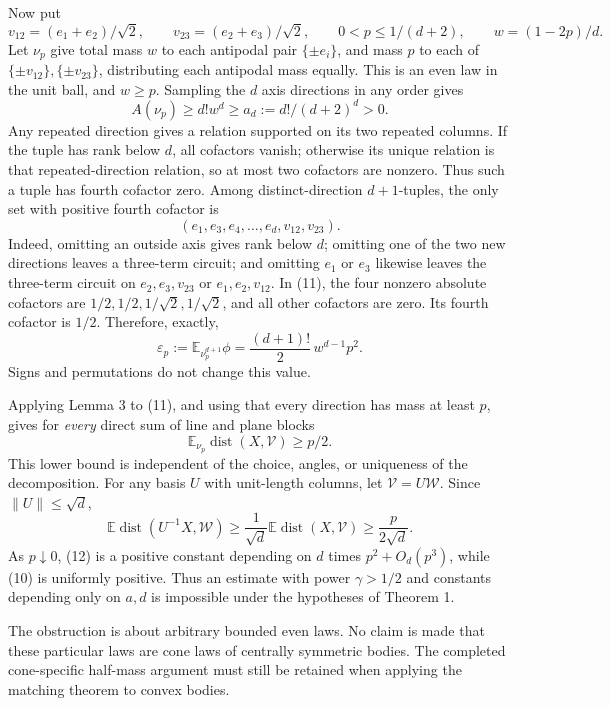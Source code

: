 \documentclass[
  11pt,
]{article}
\begin{document}
Now put \[
 v_{12}=(e_1+e_2)/\sqrt2,\qquad v_{23}=(e_2+e_3)/\sqrt2,
 \qquad 0<p\le1/(d+2),\qquad w=(1-2p)/d.
\] Let \(\nu_p\) give total mass \(w\) to each antipodal pair
\(\{\pm e_i\}\), and mass \(p\) to each of
\(\{\pm v_{12}\},\{\pm v_{23}\}\), distributing each antipodal mass
equally. This is an even law in the unit ball, and \(w\ge p\). Sampling
the \(d\) axis directions in any order gives \[
 A(\nu_p)\ge d!w^d\ge a_d:=d!/(d+2)^d>0.                 \tag{10}
\] Any repeated direction gives a relation supported on its two repeated
columns. If the tuple has rank below \(d\), all cofactors vanish;
otherwise its unique relation is that repeated-direction relation, so at
most two cofactors are nonzero. Thus such a tuple has fourth cofactor
zero. Among distinct-direction \(d+1\)-tuples, the only set with
positive fourth cofactor is \[
 (e_1,e_3,e_4,\ldots,e_d,v_{12},v_{23}).                     \tag{11}
\] Indeed, omitting an outside axis gives rank below \(d\); omitting one
of the two new directions leaves a three-term circuit; and omitting
\(e_1\) or \(e_3\) likewise leaves the three-term circuit on
\(e_2,e_3,v_{23}\) or \(e_1,e_2,v_{12}\). In (11), the four nonzero
absolute cofactors are \(1/2,1/2,1/\sqrt2,1/\sqrt2\), and all other
cofactors are zero. Its fourth cofactor is \(1/2\). Therefore, exactly,
\[
 \varepsilon_p:=\mathbb E_{\nu_p^{d+1}}\phi
 =\frac{(d+1)!}{2}\,w^{d-1}p^2.                            \tag{12}
\] Signs and permutations do not change this value.

Applying Lemma 3 to (11), and using that every direction has mass at
least \(p\), gives for \emph{every} direct sum of line and plane blocks
\[
 \mathbb E_{\nu_p}\operatorname{dist}(X,\mathcal V)
 \ge p/2.                                                  \tag{13}
\] This lower bound is independent of the choice, angles, or uniqueness
of the decomposition. For any basis \(U\) with unit-length columns, let
\(\mathcal V=U\mathcal W\). Since \(\|U\|\le\sqrt d\), \[
 \mathbb E\operatorname{dist}(U^{-1}X,\mathcal W)
 \ge\frac1{\sqrt d}\mathbb E\operatorname{dist}(X,\mathcal V)
 \ge\frac p{2\sqrt d}.                                    \tag{14}
\] As \(p\downarrow0\), (12) is a positive constant depending on \(d\)
times \(p^2+O_d(p^3)\), while (10) is uniformly positive. Thus an
estimate with power \(\gamma>1/2\) and constants depending only on
\(a,d\) is impossible under the hypotheses of Theorem 1.

The obstruction is about arbitrary bounded even laws. No claim is made
that these particular laws are cone laws of centrally symmetric bodies.
The completed cone-specific half-mass argument must still be retained
when applying the matching theorem to convex bodies.
\end{document}
